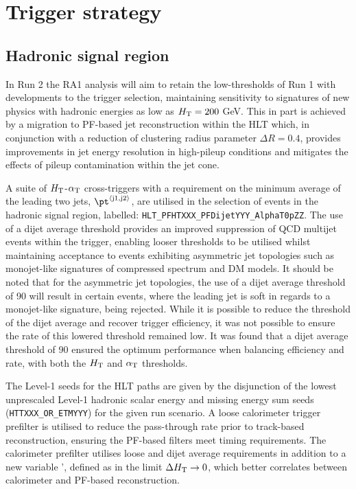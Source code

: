 \section{Trigger strategy}
\label{sec:triggers}


\subsection{Hadronic signal region\label{sec:hadronic_signal_region}}

In Run 2 the RA1 analysis will aim to retain the low-thresholds of Run 1 with developments 
to the trigger selection, maintaining sensitivity to signatures of new physics with hadronic 
energies as low as $\mbox{$H_\text{T}$} = 200$ GeV. This in part is achieved by a migration to PF-based 
jet reconstruction within the HLT which, in conjunction with a reduction of clustering radius 
parameter $\Delta R = 0.4$, provides improvements in jet energy resolution in high-pileup 
conditions and mitigates the effects of pileup contamination within the jet cone.

A suite of $\mbox{$H_\text{T}$}$-$\alpha_{\text{T}}$ cross-triggers with a requirement on the minimum average \pt of 
the leading two jets, $\pt^{\rm \left<j1,j2\right>}$, are utilised in the selection of events in 
the hadronic signal region, labelled: \verb!HLT_PFHTXXX_PFDijetYYY_AlphaT0pZZ!. The use of a 
dijet average threshold provides an improved suppression of QCD multijet events within the trigger,
enabling looser \alphat thresholds to be utilised whilst maintaining acceptance to events exhibiting asymmetric jet 
topologies such as monojet-like signatures of compressed spectrum and DM models. 
It should be noted that for the asymmetric jet topologies, the use of a dijet average threshold of 90 \GeV
will result in certain events, where the leading jet \pt is soft in regards to a monojet-like signature, being
rejected. While it is possible to reduce the threshold of the dijet average and recover trigger efficiency,
it was not possible to ensure the rate of this lowered threshold remained low. It was found that a dijet average
threshold of 90 \GeV ensured the optimum performance when balancing efficiency and rate, with both the $\mbox{$H_\text{T}$}$ and $\alpha_{\text{T}}$
thresholds. 

The Level-1 seeds for the HLT paths are given by the disjunction of the lowest 
unprescaled Level-1 hadronic scalar energy and missing energy sum seeds (\verb!HTTXXX_OR_ETMYYY!) for 
the given run scenario. A loose calorimeter trigger prefilter is utilised to reduce the pass-through 
rate prior to track-based 
reconstruction, ensuring the PF-based filters meet timing requirements. The calorimeter prefilter 
utilises loose \scalht and dijet average \pt requirements in addition to a new variable \alphat', 
defined as \alphat in the limit $\Delta\mbox{$H_\text{T}$} \rightarrow 0$, which better correlates \alphat 
between calorimeter and PF-based reconstruction.

